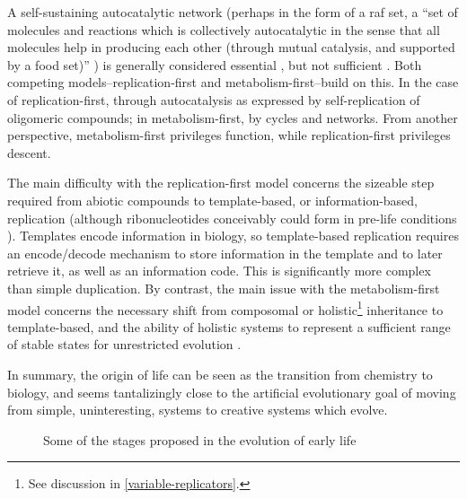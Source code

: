 A self-sustaining autocatalytic network (perhaps in the form of a \gls{raf} set, a ``set of molecules and reactions which is collectively autocatalytic in the sense that all molecules help in producing each other (through mutual catalysis, and supported by a food set)'' \parencite{Hordijk2011}) is generally considered essential \parencite{Pross2013}, but not sufficient \parencite{Hordijk2011}. Both competing models--replication-first and metabolism-first--build on this. In the case of replication-first, through autocatalysis as expressed by self-replication of oligomeric compounds; in metabolism-first, by cycles and networks. From another perspective, metabolism-first privileges function, while replication-first privileges descent.

The main difficulty with the replication-first model concerns the sizeable step required from abiotic compounds to template-based, or information-based, replication (although ribonucleotides conceivably could form in pre-life conditions \parencite{Powner2009}). Templates encode information in biology, so template-based replication requires an encode/decode mechanism to store information in the template and to later retrieve it, as well as an information code. This is significantly more complex than simple duplication. By contrast, the main issue with the metabolism-first model concerns the necessary shift from composomal or holistic\footnote{See discussion in \cref{variable-replicators}.} inheritance to template-based, and the ability of holistic systems to represent a sufficient range of stable states for unrestricted evolution \parencite{Vasas2010}.

In summary, the origin of life can be seen as the transition from chemistry to biology, and seems tantalizingly close to the artificial evolutionary goal of moving from simple, uninteresting, systems to creative systems which evolve. 

\begin{figure}
	\begin{center}
	\end{center}
	\caption{Some of the stages proposed in the evolution of early life}
	\label{major-stages-early-life}
\end{figure}

